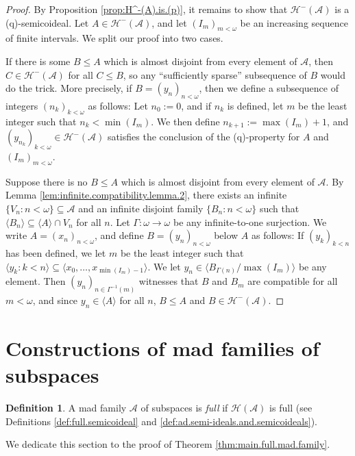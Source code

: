 \documentclass[11pt,reqno]{amsart}
\theoremstyle{plain}
\numberwithin{equation}{section}
\theoremstyle{definition}
\newtheorem{definition}[theorem]{Definition}
\renewcommand{\c}[1]{\langle #1 \rangle}
\newcommand{\cal}{\mathcal}
\newcommand{\A}{\cal{A}}
\renewcommand{\H}{\cal{H}}
\begin{document}
\begin{proof}
    By Proposition \ref{prop:H^-(A).is.(p)}, it remains to show that $\H^-(\A)$ is a (q)-semicoideal. Let $A \in \H^-(\A)$, and let $(I_m)_{m<\omega}$ be an increasing sequence of finite intervals. We split our proof into two cases.

    If there is some $B \leq A$ which is almost disjoint from every element of $\A$, then $C \in \H^-(\A)$ for all $C \leq B$, so any ``sufficiently sparse'' subsequence of $B$ would do the trick. More precisely, if $B = (y_n)_{n<\omega}$, then we define a subsequence of integers $(n_k)_{k<\omega}$ as follows: Let $n_0 := 0$, and if $n_k$ is defined, let $m$ be the least integer such that $n_k < \min(I_m)$. We then define $n_{k+1} := \max(I_m) + 1$, and $(y_{n_k})_{k<\omega} \in \H^-(\A)$ satisfies the conclusion of the (q)-property for $A$ and $(I_m)_{m<\omega}$.

    Suppose there is no $B \leq A$ which is almost disjoint from every element of $\A$. By Lemma \ref{lem:infinite.compatibility.lemma.2}, there exists an infinite $\{V_n : n < \omega\} \subseteq \A$ and an infinite disjoint family $\{B_n : n < \omega\}$ such that $\c{B_n} \subseteq \c{A} \cap V_n$ for all $n$. Let $\Gamma : \omega \to \omega$ be any infinite-to-one surjection. We write $A = (x_n)_{n<\omega}$, and define $B = (y_n)_{n<\omega}$ below $A$ as follows: If $(y_k)_{k<n}$ has been defined, we let $m$ be the least integer such that $\c{y_k : k < n} \subseteq \c{x_0,\dots,x_{\min(I_m)-1}}$. We let $y_n \in \c{B_{\Gamma(n)}/\max(I_m)}$ be any element. Then $(y_n)_{n \in \Gamma^{-1}(m)}$ witnesses that $B$ and $B_m$ are compatible for all $m < \omega$, and since $y_n \in \c{A}$ for all $n$, $B \leq A$ and $B \in \H^-(\A)$.
\end{proof}

\section{Constructions of mad families of subspaces}
\label{sec:full.mad.families}
\begin{definition}
\label{def:full.mad.family}
    A mad family $\A$ of subspaces is \emph{full} if $\H(\A)$ is full (see Definitions \ref{def:full.semicoideal} and \ref{def:ad.semi-ideals.and.semicoideals}).
\end{definition}

We dedicate this section to the proof of Theorem \ref{thm:main.full.mad.family}.
\end{document}
